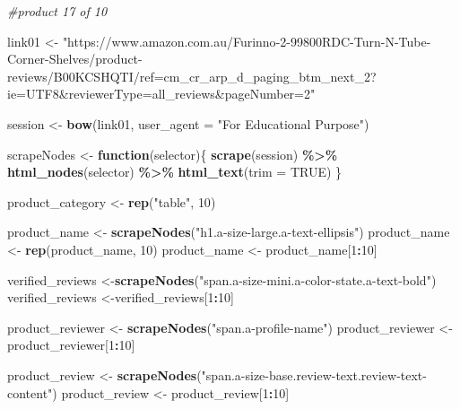 \documentclass[
]{article}
\newenvironment{Shaded}{\begin{snugshade}}{\end{snugshade}}
\newcommand{\AttributeTok}[1]{\textcolor[rgb]{0.13,0.29,0.53}{#1}}
\newcommand{\CommentTok}[1]{\textcolor[rgb]{0.56,0.35,0.01}{\textit{#1}}}
\newcommand{\ConstantTok}[1]{\textcolor[rgb]{0.56,0.35,0.01}{#1}}
\newcommand{\ControlFlowTok}[1]{\textcolor[rgb]{0.13,0.29,0.53}{\textbf{#1}}}
\newcommand{\DecValTok}[1]{\textcolor[rgb]{0.00,0.00,0.81}{#1}}
\newcommand{\FunctionTok}[1]{\textcolor[rgb]{0.13,0.29,0.53}{\textbf{#1}}}
\newcommand{\NormalTok}[1]{#1}
\newcommand{\OtherTok}[1]{\textcolor[rgb]{0.56,0.35,0.01}{#1}}
\newcommand{\SpecialCharTok}[1]{\textcolor[rgb]{0.81,0.36,0.00}{\textbf{#1}}}
\newcommand{\StringTok}[1]{\textcolor[rgb]{0.31,0.60,0.02}{#1}}
\begin{document}
\begin{Shaded}
\begin{Highlighting}[]
\CommentTok{\#product 17 of 10}

\NormalTok{link01 }\OtherTok{\textless{}{-}} \StringTok{"https://www.amazon.com.au/Furinno{-}2{-}99800RDC{-}Turn{-}N{-}Tube{-}Corner{-}Shelves/product{-}reviews/B00KCSHQTI/ref=cm\_cr\_arp\_d\_paging\_btm\_next\_2?ie=UTF8\&reviewerType=all\_reviews\&pageNumber=2"}


\NormalTok{  session }\OtherTok{\textless{}{-}} \FunctionTok{bow}\NormalTok{(link01,}
               \AttributeTok{user\_agent =} \StringTok{"For Educational Purpose"}\NormalTok{)}

\NormalTok{  scrapeNodes }\OtherTok{\textless{}{-}} \ControlFlowTok{function}\NormalTok{(selector)\{}
    \FunctionTok{scrape}\NormalTok{(session) }\SpecialCharTok{\%\textgreater{}\%}
      \FunctionTok{html\_nodes}\NormalTok{(selector) }\SpecialCharTok{\%\textgreater{}\%}
      \FunctionTok{html\_text}\NormalTok{(}\AttributeTok{trim =} \ConstantTok{TRUE}\NormalTok{)}
\NormalTok{  \}}

\NormalTok{  product\_category }\OtherTok{\textless{}{-}} \FunctionTok{rep}\NormalTok{(}\StringTok{"table"}\NormalTok{, }\DecValTok{10}\NormalTok{)}

\NormalTok{  product\_name }\OtherTok{\textless{}{-}} \FunctionTok{scrapeNodes}\NormalTok{(}\StringTok{"h1.a{-}size{-}large.a{-}text{-}ellipsis"}\NormalTok{)}
\NormalTok{  product\_name }\OtherTok{\textless{}{-}} \FunctionTok{rep}\NormalTok{(product\_name, }\DecValTok{10}\NormalTok{)}
\NormalTok{  product\_name }\OtherTok{\textless{}{-}}\NormalTok{ product\_name[}\DecValTok{1}\SpecialCharTok{:}\DecValTok{10}\NormalTok{]}
  
\NormalTok{  verified\_reviews }\OtherTok{\textless{}{-}}\FunctionTok{scrapeNodes}\NormalTok{(}\StringTok{"span.a{-}size{-}mini.a{-}color{-}state.a{-}text{-}bold"}\NormalTok{)}
\NormalTok{  verified\_reviews }\OtherTok{\textless{}{-}}\NormalTok{verified\_reviews[}\DecValTok{1}\SpecialCharTok{:}\DecValTok{10}\NormalTok{]}
  
\NormalTok{  product\_reviewer }\OtherTok{\textless{}{-}} \FunctionTok{scrapeNodes}\NormalTok{(}\StringTok{"span.a{-}profile{-}name"}\NormalTok{)}
\NormalTok{  product\_reviewer }\OtherTok{\textless{}{-}}\NormalTok{ product\_reviewer[}\DecValTok{1}\SpecialCharTok{:}\DecValTok{10}\NormalTok{]}
  
\NormalTok{  product\_review }\OtherTok{\textless{}{-}} \FunctionTok{scrapeNodes}\NormalTok{(}\StringTok{"span.a{-}size{-}base.review{-}text.review{-}text{-}content"}\NormalTok{)}
\NormalTok{  product\_review }\OtherTok{\textless{}{-}}\NormalTok{ product\_review[}\DecValTok{1}\SpecialCharTok{:}\DecValTok{10}\NormalTok{]}
  

\end{Highlighting}
\end{Shaded}
\end{document}

